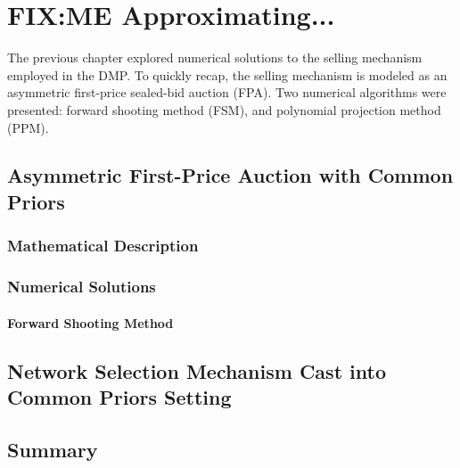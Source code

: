 \chapter{FIX:ME Approximating...}
\label{cha:approximation}

\minitoc
\vspace{10mm}

The previous chapter explored numerical solutions to the selling mechanism employed in the DMP. To quickly recap, the selling mechanism is modeled as an asymmetric first-price sealed-bid auction (FPA). Two numerical algorithms were presented: forward shooting method (FSM), and polynomial projection method (PPM).

\section{Asymmetric First-Price Auction with Common Priors} %
\label{sec:asymmetric_first_price_auction_with_common_priors}

\subsection{Mathematical Description} %
\label{sub:mathematical_description}


\subsection{Numerical Solutions} %
\label{sub:numerical_solutions}

\subsubsection{Forward Shooting Method} %
\label{ssub:forward_shooting_method}




\section{Network Selection Mechanism Cast into Common Priors Setting} %
\label{sec:network_selection_mechanism_cast_into_common_priors_setting}


\section{Summary} %
\label{sec:summary_approximation}

